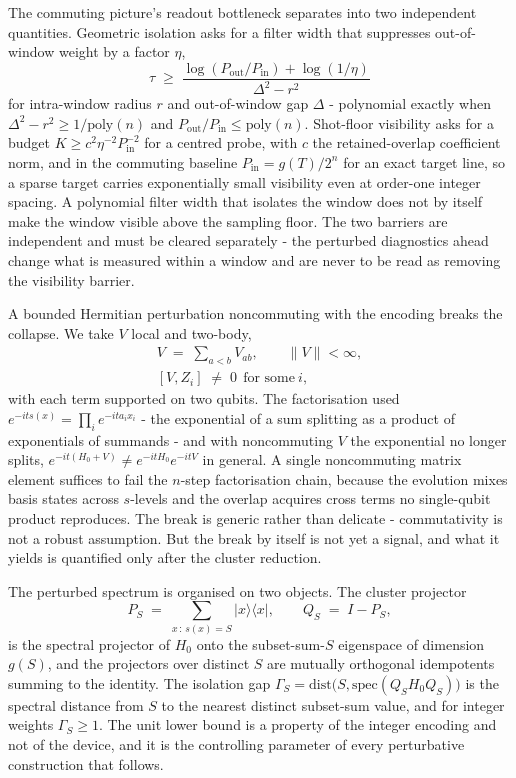 The commuting picture's readout bottleneck separates into two independent quantities. Geometric isolation asks for a filter width that suppresses out-of-window weight by a factor $\eta$,
\[
\tau \;\ge\; \frac{\log(P_{\mathrm{out}}/P_{\mathrm{in}}) + \log(1/\eta)}{\Delta^2 - r^2}
\]
for intra-window radius $r$ and out-of-window gap $\Delta$ - polynomial exactly when $\Delta^2 - r^2 \ge 1/\mathrm{poly}(n)$ and $P_{\mathrm{out}}/P_{\mathrm{in}} \le \mathrm{poly}(n)$. Shot-floor visibility asks for a budget $K \ge c^2 \eta^{-2} P_{\mathrm{in}}^{-2}$ for a centred probe, with $c$ the retained-overlap coefficient norm, and in the commuting baseline $P_{\mathrm{in}} = g(T)/2^n$ for an exact target line, so a sparse target carries exponentially small visibility even at order-one integer spacing. A polynomial filter width that isolates the window does not by itself make the window visible above the sampling floor. The two barriers are independent and must be cleared separately - the perturbed diagnostics ahead change what is measured within a window and are never to be read as removing the visibility barrier.

A bounded Hermitian perturbation noncommuting with the encoding breaks the collapse. We take $V$ local and two-body,
\[
\begin{gathered}
V \;=\; \sum_{a<b} V_{ab}, \qquad \|V\| < \infty, \\
[V, Z_i] \;\neq\; 0 \ \ \text{for some}\ i,
\end{gathered}
\]
with each term supported on two qubits. The factorisation used $e^{-i t s(x)} = \prod_i e^{-i t a_i x_i}$ - the exponential of a sum splitting as a product of exponentials of summands - and with noncommuting $V$ the exponential no longer splits, $e^{-i t (H_0 + V)} \neq e^{-i t H_0} e^{-i t V}$ in general. A single noncommuting matrix element suffices to fail the $n$-step factorisation chain, because the evolution mixes basis states across $s$-levels and the overlap acquires cross terms no single-qubit product reproduces. The break is generic rather than delicate - commutativity is not a robust assumption. But the break by itself is not yet a signal, and what it yields is quantified only after the cluster reduction.

The perturbed spectrum is organised on two objects. The cluster projector
\[
P_S \;=\; \sum_{x \,:\, s(x) = S} |x\rangle\langle x|, \qquad Q_S \;=\; I - P_S,
\]
is the spectral projector of $H_0$ onto the subset-sum-$S$ eigenspace of dimension $g(S)$, and the projectors over distinct $S$ are mutually orthogonal idempotents summing to the identity. The isolation gap $\Gamma_S = \mathrm{dist}\bigl(S, \mathrm{spec}(Q_S H_0 Q_S)\bigr)$ is the spectral distance from $S$ to the nearest distinct subset-sum value, and for integer weights $\Gamma_S \ge 1$. The unit lower bound is a property of the integer encoding and not of the device, and it is the controlling parameter of every perturbative construction that follows.

